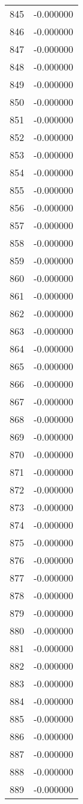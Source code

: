 \documentclass[12pt]{article}
\begin{document}
\begin{longtable}{@{}cc@{}}
845 & -0.000000 \\
846 & -0.000000 \\
847 & -0.000000 \\
848 & -0.000000 \\
849 & -0.000000 \\
850 & -0.000000 \\
851 & -0.000000 \\
852 & -0.000000 \\
853 & -0.000000 \\
854 & -0.000000 \\
855 & -0.000000 \\
856 & -0.000000 \\
857 & -0.000000 \\
858 & -0.000000 \\
859 & -0.000000 \\
860 & -0.000000 \\
861 & -0.000000 \\
862 & -0.000000 \\
863 & -0.000000 \\
864 & -0.000000 \\
865 & -0.000000 \\
866 & -0.000000 \\
867 & -0.000000 \\
868 & -0.000000 \\
869 & -0.000000 \\
870 & -0.000000 \\
871 & -0.000000 \\
872 & -0.000000 \\
873 & -0.000000 \\
874 & -0.000000 \\
875 & -0.000000 \\
876 & -0.000000 \\
877 & -0.000000 \\
878 & -0.000000 \\
879 & -0.000000 \\
880 & -0.000000 \\
881 & -0.000000 \\
882 & -0.000000 \\
883 & -0.000000 \\
884 & -0.000000 \\
885 & -0.000000 \\
886 & -0.000000 \\
887 & -0.000000 \\
888 & -0.000000 \\
889 & -0.000000 \\

\end{longtable}
\end{document}
